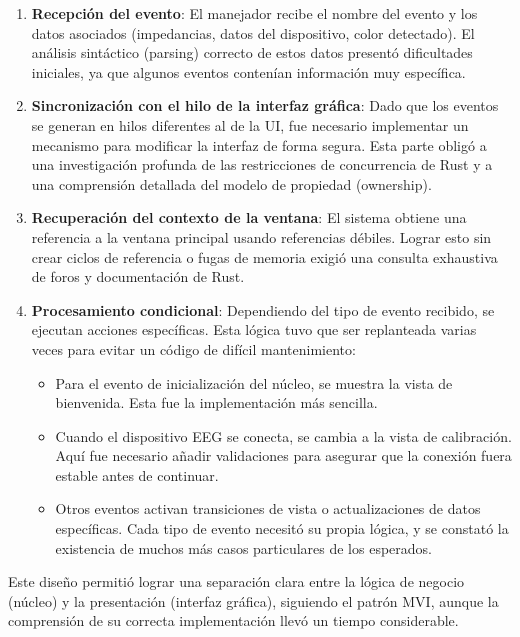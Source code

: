\begin{enumerate}
    \item \textbf{Recepción del evento}: El manejador recibe el nombre del evento y los datos asociados (impedancias, datos del dispositivo, color detectado). El análisis sintáctico (parsing) correcto de estos datos presentó dificultades iniciales, ya que algunos eventos contenían información muy específica.
    
    \item \textbf{Sincronización con el hilo de la interfaz gráfica}: Dado que los eventos se generan en hilos diferentes al de la UI, fue necesario implementar un mecanismo para modificar la interfaz de forma segura. Esta parte obligó a una investigación profunda de las restricciones de concurrencia de Rust y a una comprensión detallada del modelo de propiedad (ownership).
    
    \item \textbf{Recuperación del contexto de la ventana}: El sistema obtiene una referencia a la ventana principal usando referencias débiles. Lograr esto sin crear ciclos de referencia o fugas de memoria exigió una consulta exhaustiva de foros y documentación de Rust.
    
    \item \textbf{Procesamiento condicional}: Dependiendo del tipo de evento recibido, se ejecutan acciones específicas. Esta lógica tuvo que ser replanteada varias veces para evitar un código de difícil mantenimiento:
    \begin{itemize}
        \item Para el evento de inicialización del núcleo, se muestra la vista de bienvenida. Esta fue la implementación más sencilla.
        \item Cuando el dispositivo EEG se conecta, se cambia a la vista de calibración. Aquí fue necesario añadir validaciones para asegurar que la conexión fuera estable antes de continuar.
        \item Otros eventos activan transiciones de vista o actualizaciones de datos específicas. Cada tipo de evento necesitó su propia lógica, y se constató la existencia de muchos más casos particulares de los esperados.
    \end{itemize}
\end{enumerate}

Este diseño permitió lograr una separación clara entre la lógica de negocio (núcleo) y la presentación (interfaz gráfica), siguiendo el patrón MVI, aunque la comprensión de su correcta implementación llevó un tiempo considerable.

